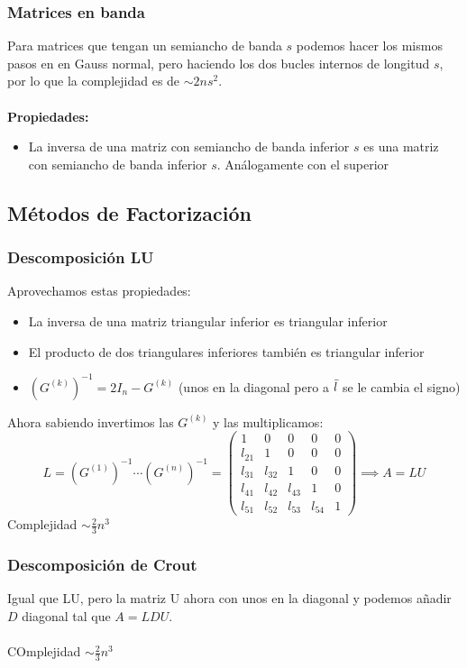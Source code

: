 \documentclass[leqno]{article}
\begin{document}
\subsubsection{Matrices en banda}
Para matrices que tengan un semiancho de banda $s$ podemos hacer los mismos pasos en en Gauss normal, pero haciendo los dos bucles internos de longitud $s$, por lo que la complejidad es de $\sim 2ns^2$. \\
\\\textbf{Propiedades:}
\begin{itemize}
    \item La inversa de una matriz con semiancho de banda inferior $s$ es una matriz con semiancho de banda inferior $s$. Análogamente con el superior
\end{itemize}

\subsection{Métodos de Factorización}
\subsubsection{Descomposición LU}
Aprovechamos estas propiedades:
\begin{itemize}
    \item La inversa de una matriz triangular inferior es triangular inferior
    \item El producto de dos triangulares inferiores también es triangular inferior
    \item $(G^{(k)})^{-1} = 2I_n-G^{(k)}$ (unos en la diagonal pero a $\Bar{l}$ se le cambia el signo)
\end{itemize}
Ahora sabiendo invertimos las $G^{(k)}$ y las multiplicamos:
\[ L = (G^{(1)})^{-1} \cdots (G^{(n)})^{-1}=
\begin{pmatrix}
    1 & 0 & 0 & 0 & 0\\
    l_{21} & 1 & 0 & 0 & 0 \\
    l_{31} & l_{32} & 1 & 0 & 0 \\
    l_{41} & l_{42} & l_{43} & 1 & 0 \\
    l_{51} & l_{52} & l_{53} & l_{54} & 1
\end{pmatrix}
\implies A = LU
\]
Complejidad $\sim \frac{2}{3}n^3$

\subsubsection{Descomposición de Crout}
Igual que LU, pero la matriz U ahora con unos en la diagonal y podemos añadir $D$ diagonal tal que $A=LDU$. \\
\\
COmplejidad $\sim \frac{2}{3}n^3$
\end{document}
